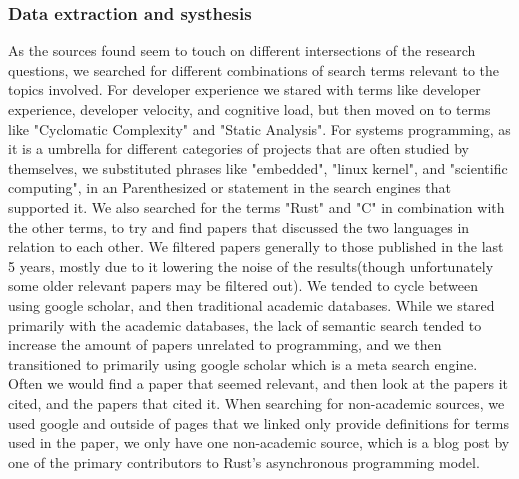 \documentclass[conference]{IEEEtran}
\begin{document}
\subsubsection{\color{Black} Data extraction and systhesis}
\label{data_collection}
{
    As the sources found seem to touch on different intersections of the research questions, we searched for different combinations of search terms relevant to the topics involved.
    For developer experience we stared with terms like developer experience, developer velocity, and cognitive load, but then moved on to terms like "Cyclomatic Complexity" and "Static Analysis".
    For systems programming, as it is a umbrella for different categories of projects that are often studied
    by themselves, we substituted phrases like "embedded", "linux kernel", and "scientific computing", in an Parenthesized or statement in the search engines that supported it. We also searched for the terms "Rust" and "C" in combination with the other terms, to try and find papers that discussed the two languages in relation to each other.
    We filtered papers generally to those published in the last 5 years, mostly due to it lowering the noise of the results(though unfortunately some older relevant papers may be filtered out). We tended to cycle between using google scholar, and then traditional academic databases.
    While we stared primarily with the academic databases, the
    lack of semantic search tended to increase the amount of papers unrelated to programming, and we then transitioned to primarily using google scholar which is a meta search engine.
    Often we would find a paper that seemed relevant, and then look at the papers it cited, and the papers that cited it.
    When searching for non-academic sources, we used google and outside of pages that we linked only provide definitions for terms used in the paper, we only have one non-academic source, which
    is a blog post by one of the primary contributors to Rust's asynchronous programming model.
}
\end{document}
